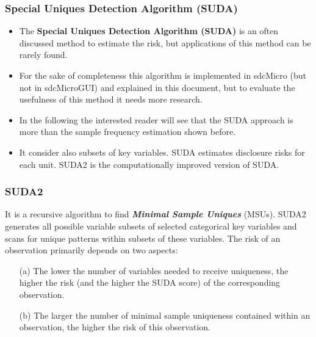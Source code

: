 \documentclass{beamer}
\begin{document}
	\begin{frame}
		
		\frametitle{Special Uniques Detection Algorithm (SUDA)}
		\begin{itemize}
		\item The \textbf{Special Uniques Detection Algorithm (SUDA)} is an often discussed method
		to estimate the risk, but applications of this method can be rarely found. 
		\item For
		the sake of completeness this algorithm is implemented in sdcMicro (but not in
		sdcMicroGUI) and explained in this document, but to evaluate the usefulness of
		this method it needs more research. 
		
		\item In the following the interested reader will
		see that the SUDA approach is more than the sample frequency estimation shown
		before. 
		\item It consider also subsets of key variables. SUDA estimates disclosure risks
		for each unit. SUDA2  is the computationally improved
		version of SUDA. 
		\end{itemize}
	\end{frame}

	\begin{frame}
		\frametitle{SUDA2}
		It is a recursive algorithm to find \textbf{\textit{Minimal Sample Uniques}}
		(MSUs). SUDA2 generates all possible variable subsets of selected categorical key
		variables and scans for unique patterns within subsets of these variables. The risk
		of an observation primarily depends on two aspects:
		
		\begin{itemize}
			\item[(a)] The lower the number of variables needed to receive uniqueness, the higher
			the risk (and the higher the SUDA score) of the corresponding observation.
			\item[(b)] The larger the number of minimal sample uniqueness contained within an
			observation, the higher the risk of this observation.
		\end{itemize}
		
	\end{frame}
\end{document}
